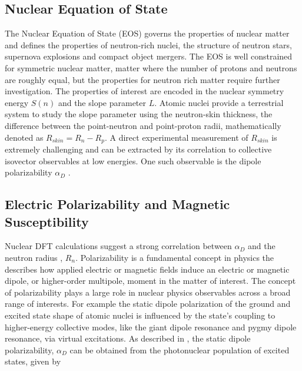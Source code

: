 \documentclass[cnatzke_thesis_proposal.tex]{subfiles}
\begin{document}
    \subsection{Nuclear Equation of State}
The Nuclear Equation of State (EOS) governs the properties of nuclear matter and defines the properties of neutron-rich nuclei, the structure of neutron stars, supernova explosions and compact object mergers. \cite{Kaufmann2020} The EOS is well constrained for symmetric nuclear matter, matter where the number of protons and neutrons are roughly equal, but the properties for neutron rich matter require further investigation. \cite{Danielewicz2002} 
The properties of interest are encoded in the nuclear symmetry energy $S(n)$ and the slope parameter $L$. Atomic nuclei provide a terrestrial system to study the slope parameter using the neutron-skin thickness, the difference between the point-neutron and point-proton radii, mathematically denoted as $R_{skin} = R_n - R_p$. \cite{Tsang2012} A direct experimental measurement of $R_{skin}$ is extremely challenging and can be extracted by its correlation to collective isovector observables at low energies. \cite{Birkhan2017} One such observable is the dipole polarizability $\alpha_D$ \cite{Birkhan2017}.

\subsection{Electric Polarizability and Magnetic Susceptibility}

Nuclear DFT calculations suggest a strong correlation between $\alpha_D$ and the neutron radius \cite{hagen_neutron_2016}, $R_{n}$. 
Polarizability is a fundamental concept in physics the describes how applied electric or magnetic fields induce an electric or magnetic dipole, or higher-order multipole, moment in the matter of interest.\cite{jackson_classical_1999} The concept of polarizability plays a large role in nuclear physics observables across a broad range of interests. For example the static dipole polarization of the ground and excited state shape of atomic nuclei is influenced by the state's coupling to higher-energy collective modes, like the giant dipole resonance and pygmy dipole resonance, via virtual excitations. As described in \cite{soderstrom_electromagnetic_2020}, the static dipole polarizability, $\alpha_D$ can be obtained from the photonuclear population of excited states, given by
\end{document}
